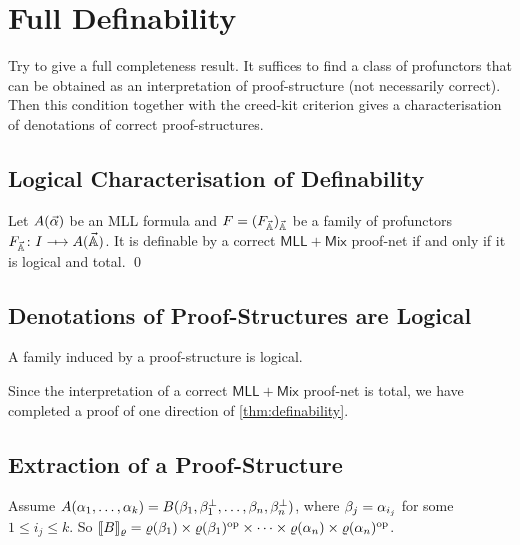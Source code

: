 \section{Full Definability}
Try to give a full completeness result.
It suffices to find a class of profunctors that can be obtained as an interpretation of proof-structure (not necessarily correct).
Then this condition together with the creed-kit criterion gives a characterisation of denotations of correct proof-structures.


\subsection{Logical Characterisation of Definability}


\begin{theorem}\label{thm:definability}
    Let \( A(\vec{\alpha}) \) be an MLL formula and \( F = (F_{\vec{\mathbb{A}}})_{\vec{\mathbb{A}}} \) be a family of profunctors \( F_{\vec{\Grp}} \colon I \profarrow A(\vec{\Grp}) \).
    It is definable by a correct \( \mathsf{MLL+Mix} \) proof-net if and only if it is logical and total.
    \qed
\end{theorem}


\subsection{Denotations of Proof-Structures are Logical}

\begin{lemma}
    A family induced by a proof-structure is logical.
\end{lemma}

Since the interpretation of a correct \( \mathsf{MLL+Mix} \) proof-net is total, we have completed a proof of one direction of \cref{thm:definability}.


\subsection{Extraction of a Proof-Structure}

Assume \( A(\alpha_1,\dots,\alpha_k) = B(\beta_1, \beta_1^\bot, \dots, \beta_n, \beta_n^{\bot}) \), where \( \beta_j = \alpha_{i_j} \) for some \( 1 \le i_j \le k \).
So \( \llbracket{B}\rrbracket_{\varrho} = \varrho(\beta_1) \times \varrho(\beta_1)^{\mathrm{op}} \times \dots \times \varrho(\alpha_n) \times \varrho(\alpha_n)^{\mathrm{op}} \).

